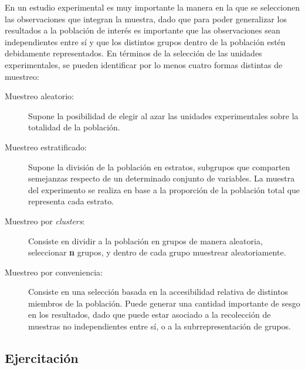 \documentclass[authoryear,a4paper, 14pt]{scrartcl}
\begin{document}
En un estudio experimental es muy importante la manera en la que se seleccionen las observaciones que integran la muestra, dado que para poder generalizar los resultados a la población de interés es importante que las observaciones sean independientes entre sí y que los distintos grupos dentro de la población estén debidamente representados. En términos de la selección de las unidades experimentales, se pueden identificar por lo menos cuatro formas distintas de muestreo:

\begin{description}
    \item[\small{Muestreo aleatorio:}]
        Supone la posibilidad de elegir al azar las unidades experimentales sobre la totalidad de la población.
    \item[\small{Muestreo estratificado:}]
        Supone la división de la población en estratos, subgrupos que comparten semejanzas respecto de un determinado conjunto de variables. La muestra del experimento se realiza en base a la proporción de la población total que representa cada estrato.
    \item[\small{Muestreo por \emph{clusters}:}]
        Consiste en dividir a la población en grupos de manera aleatoria, seleccionar \textbf{n} grupos, y dentro de cada grupo muestrear aleatoriamente.
    \item[\small{Muestreo por conveniencia:}]
        Consiste en una selección basada en la accesibilidad relativa de distintos miembros de la población. Puede generar una cantidad importante de sesgo en los resultados, dado que puede estar asociado a la recolección de muestras no independientes entre sí, o a la subrrepresentación de grupos.
\end{description}




\hypertarget{ejercitacion-5}{%
\subsection{Ejercitación}\label{ejercitacion-5}}
\end{document}
